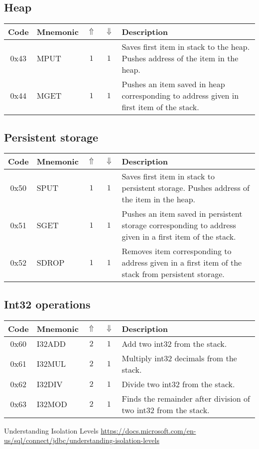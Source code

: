\documentclass[12pt,a4paper]{article}
\begin{document}
\subsection{Heap}
\begin{tabularx}{\textwidth}{ c l c c p{7cm} }
\textbf{Code} & \textbf{Mnemonic} & \textbf{$\Uparrow$} & \textbf{$\Downarrow$} & \textbf{Description} \\
\hline
0x43 & MPUT & $1$ & $1$ & Saves first item in stack to the heap. Pushes address of the item in the heap. \\
\hline
0x44 & MGET & $1$ & $1$ & Pushes an item saved in heap corresponding to address given in first item of the stack.  \\
\hline
\end{tabularx}

\subsection{Persistent storage}
\begin{tabularx}{\textwidth}{ c l c c p{7cm} }
\textbf{Code} & \textbf{Mnemonic} & \textbf{$\Uparrow$} & \textbf{$\Downarrow$} & \textbf{Description} \\
\hline
0x50 & SPUT & $1$ & $1$ & Saves first item in stack to persistent storage. Pushes address of the item in the heap. \\
\hline
0x51 & SGET & $1$ & $1$ & Pushes an item saved in persistent storage corresponding to address given in a first item of the stack.  \\
0x52 & SDROP & $1$ & $1$ & Removes item corresponding to address given in a first item of the stack from persistent storage.  \\
\hline
\end{tabularx}

\subsection{Int32 operations}
\begin{tabularx}{\textwidth}{ c l c c p{7cm} }
\textbf{Code} & \textbf{Mnemonic} & \textbf{$\Uparrow$} & \textbf{$\Downarrow$} & \textbf{Description} \\
\hline
0x60 & I32ADD & $2$ & $1$ & Add two int32 from the stack. \\
\hline
0x61 & I32MUL & $2$ & $1$ & Multiply int32 decimals from the stack. \\
\hline
0x62 & I32DIV & $2$ & $1$ & Divide two int32 from the stack. \\
\hline
0x63 & I32MOD & $2$ & $1$ & Finds the remainder after division of two int32 from the stack. \\
\hline
\end{tabularx}

\begin{thebibliography}{9}

 Understanding Isolation Levels \url{https://docs.microsoft.com/en-us/sql/connect/jdbc/understanding-isolation-levels}
\end{thebibliography}
\end{document}
